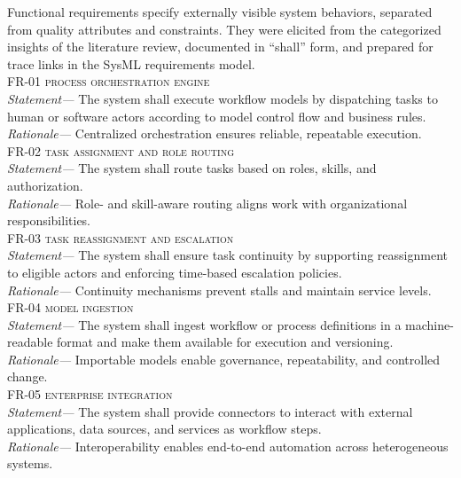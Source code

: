Functional requirements specify externally visible system behaviors, separated from quality attributes and constraints. They were elicited from the categorized insights of the literature review, documented in “shall” form, and prepared for trace links in the SysML requirements model. \\

\noindent \textsc{FR-01 process orchestration engine} \\
\indent \emph{Statement—} The system shall execute workflow models by dispatching tasks to human or software actors according to model control flow and business rules. \\
\indent \emph{Rationale—} Centralized orchestration ensures reliable, repeatable execution. \\

\noindent \textsc{FR-02 task assignment and role routing} \\
\indent \emph{Statement—} The system shall route tasks based on roles, skills, and authorization. \\
\indent \emph{Rationale—} Role- and skill-aware routing aligns work with organizational responsibilities. \\

\noindent \textsc{FR-03 task reassignment and escalation} \\
\indent \emph{Statement—} The system shall ensure task continuity by supporting reassignment to eligible actors and enforcing time-based escalation policies. \\
\indent \emph{Rationale—} Continuity mechanisms prevent stalls and maintain service levels. \\

\noindent \textsc{FR-04 model ingestion} \\
\indent \emph{Statement—} The system shall ingest workflow or process definitions in a machine-readable format and make them available for execution and versioning. \\
\indent \emph{Rationale—} Importable models enable governance, repeatability, and controlled change. \\

\noindent \textsc{FR-05 enterprise integration} \\
\indent \emph{Statement—} The system shall provide connectors to interact with external applications, data sources, and services as workflow steps. \\
\indent \emph{Rationale—} Interoperability enables end-to-end automation across heterogeneous systems. \\

